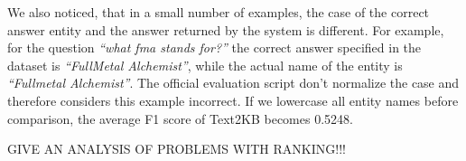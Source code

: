 We also noticed, that in a small number of examples, the case of the correct answer entity and the answer returned by the system is different.
For example, for the question \textit{``what fma stands for?''} the correct answer specified in the dataset is \textit{``FullMetal Alchemist''}, while the actual name of the entity is \textit{``Fullmetal Alchemist''}.
The official evaluation script don't normalize the case and therefore considers this example incorrect.
If we lowercase all entity names before comparison, the average F1 score of Text2KB becomes 0.5248.

GIVE AN ANALYSIS OF PROBLEMS WITH RANKING!!!
